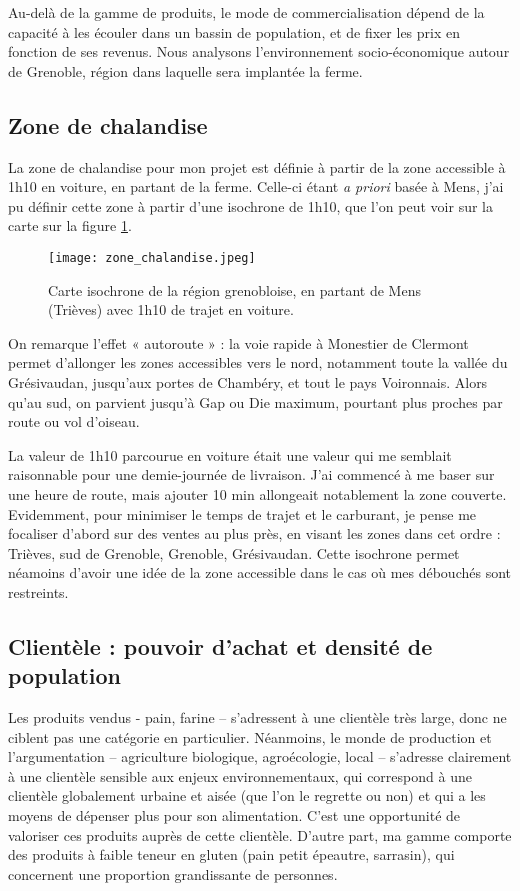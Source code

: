 \documentclass{book}
\begin{document}
Au-delà de la gamme de produits, le mode de commercialisation dépend de la capacité à les écouler dans un bassin de population, et de fixer les prix en fonction de ses revenus. Nous analysons l'environnement socio-économique autour de Grenoble, région dans laquelle sera implantée la ferme.

\subsection{Zone de chalandise}

La zone de chalandise pour mon projet est définie à partir de la zone accessible à 1h10 en voiture, en partant de la ferme. Celle-ci étant \textit{a priori} basée à Mens, j’ai pu définir cette zone à partir d’une isochrone de 1h10, que l’on peut voir sur la carte sur la figure \ref{fig:chalandise}. 

\begin{figure}[h!]
\begin{center}
	\texttt{[image: zone\_chalandise.jpeg]}
	\caption{Carte isochrone de la région grenobloise, en partant de Mens (Trièves) avec 1h10 de trajet en voiture.}
	\label{fig:chalandise}
\end{center}
\end{figure}

On remarque l’effet « autoroute » : la voie rapide à Monestier de Clermont permet d’allonger les zones accessibles vers le nord, notamment toute la vallée du Grésivaudan, jusqu’aux portes de Chambéry, et tout le pays Voironnais. Alors qu’au sud, on parvient jusqu’à Gap ou Die maximum, pourtant plus proches par route ou vol d’oiseau. 

La valeur de 1h10 parcourue en voiture était une valeur qui me semblait raisonnable pour une demie-journée de livraison. J’ai commencé à me baser sur une heure de route, mais ajouter 10 min allongeait notablement la zone couverte. Evidemment, pour minimiser le temps de trajet et le carburant, je pense me focaliser d’abord sur des ventes au plus près, en visant les zones dans cet ordre : Trièves, sud de Grenoble, Grenoble, Grésivaudan. Cette isochrone permet néamoins d'avoir une idée de la zone accessible dans le cas où mes débouchés sont restreints. 

\subsection{Clientèle : pouvoir d'achat et densité de population}

Les produits vendus - pain, farine – s’adressent à une clientèle très large, donc ne ciblent pas une catégorie en particulier. Néanmoins, le monde de production et l’argumentation – agriculture biologique, agroécologie, local – s’adresse clairement à une clientèle sensible aux enjeux environnementaux, qui correspond à une clientèle globalement urbaine et aisée (que l’on le regrette ou non) et qui a les moyens de dépenser plus pour son alimentation. C’est une opportunité de valoriser ces produits auprès de cette clientèle. D’autre part, ma gamme comporte des produits à faible teneur en gluten (pain petit épeautre, sarrasin), qui concernent une proportion grandissante de personnes.
\end{document}

